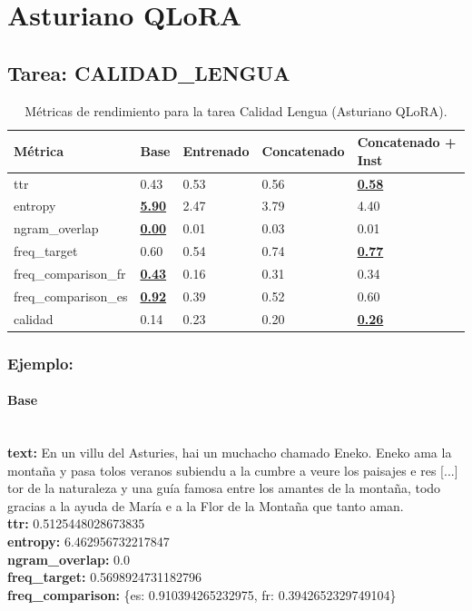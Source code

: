 \section{Asturiano QLoRA}

\subsection{Tarea: CALIDAD\_LENGUA}\label{tarea-calidad_lengua}
\begin{longtable}[]{@{}lllll@{}}
\toprule\noalign{}
Métrica & Base & Entrenado & Concatenado & Concatenado + Inst \\
\midrule\noalign{}
\endhead
\bottomrule\noalign{}
\caption{Métricas de rendimiento para la tarea Calidad Lengua (Asturiano QLoRA).}
\label{tab:metricas_calidad_lengua_Asturiano QLoRA}
\endlastfoot
ttr & 0.43 & 0.53 & 0.56 & \textbf{\underline{0.58}} \\
entropy & \textbf{\underline{5.90}} & 2.47 & 3.79 & 4.40 \\
ngram\_overlap & \textbf{\underline{0.00}} & 0.01 & 0.03 & 0.01 \\
freq\_target & 0.60 & 0.54 & 0.74 & \textbf{\underline{0.77}} \\
freq\_comparison\_fr & \textbf{\underline{0.43}} & 0.16 & 0.31 & 0.34 \\
freq\_comparison\_es & \textbf{\underline{0.92}} & 0.39 & 0.52 & 0.60 \\
calidad & 0.14 & 0.23 & 0.20 & \textbf{\underline{0.26}} \\
\end{longtable}

\subsubsection{Ejemplo:}

\paragraph{Base}~\\
\textbf{text:} En un villu del Asturies, hai un muchacho chamado Eneko. Eneko ama la montaña y pasa tolos veranos subiendu a la cumbre a veure los paisajes e res [...] tor de la naturaleza y una guía famosa entre los amantes de la montaña, todo gracias a la ayuda de María e a la Flor de la Montaña que tanto aman.\\
\textbf{ttr:} 0.5125448028673835\\
\textbf{entropy:} 6.462956732217847\\
\textbf{ngram\_overlap:} 0.0\\
\textbf{freq\_target:} 0.5698924731182796\\
\textbf{freq\_comparison:} \{\textquotesingle{}es\textquotesingle{}: 0.910394265232975, \textquotesingle{}fr\textquotesingle{}: 0.3942652329749104\}

